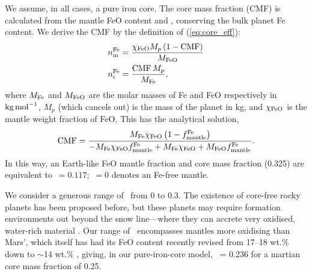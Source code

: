 We assume, in all cases, a pure iron core. The core mass fraction (CMF) is calculated from the mantle FeO content and \coreeff, conserving the bulk planet Fe content. We derive the CMF by the definition of \coreeff (\ref{eq:core_eff}):
\begin{equation}
\begin{split}
    n_{\rm m}^{\rm Fe} &= \frac{\chi_{\rm FeO} M_p \left(1 - {\rm CMF}\right)}{M_{\rm FeO}} \\
    n_{\rm c}^{\rm Fe} &= \frac{{\rm CMF} \, M_p}{M_{\rm Fe}},
\end{split}
\end{equation}
where $M_{\rm Fe}$ and $M_{\rm FeO}$ are the molar masses of Fe and FeO respectively in ${\rm kg}\,{\rm mol}^{-1}$, $M_p$ (which cancels out) is the mass of the planet in kg, and $\chi_{\rm FeO}$ is the mantle weight fraction of FeO. This has the analytical solution,
\begin{equation}\label{eq:CMF}
    {\rm CMF} = \frac{M_{\rm Fe} \chi_{\rm FeO} \left(1 - f^{\rm Fe}_{\rm mantle}\right)}{-M_{\rm Fe} \chi_{\rm FeO} f^{\rm Fe}_{\rm mantle} + M_{\rm Fe} \chi_{\rm FeO} +  M_{\rm FeO} f^{\rm Fe}_{\rm mantle}}.
\end{equation}
In this way, an Earth-like FeO mantle fraction \citep[8.05 wt.\%;][]{mcdonough_composition_1995} and core mass fraction (0.325) are equivalent to \coreeff$\,= 0.117$; \coreeff$\,= 0$ denotes an Fe-free mantle. 







We consider a generous range of \coreeff~from 0 to 0.3. The existence of core-free rocky planets has been proposed before, but these planets may require formation environments out beyond the snow line---where they can accrete very oxidised, water-rich material \citep{elkins-tanton_coreless_2008, kite_atmosphere_2020}. Our range of \coreeff~encompasses mantles more oxidising than Mars', which itself has had its FeO content recently revised from 17--18 wt.\% down to $\sim$14 wt.\% \citep{khan_geophysical_2022}, giving, in our pure-iron-core model, \coreeff~= 0.236 for a martian core mass fraction of 0.25. 

